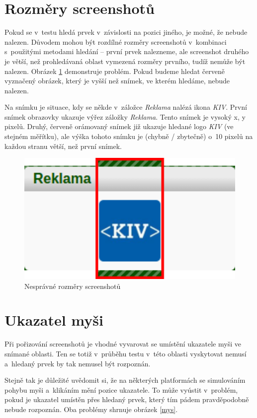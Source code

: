 	\section{Rozměry screenshotů}
	Pokud se v~testu hledá prvek v~závislosti na pozici jiného, je možné, že nebude nalezen. Důvodem mohou být rozdílné rozměry screenshotů v~kombinaci s~použitými metodami hledání -- první prvek nalezneme, ale screenshot druhého je větší, než prohledávaná oblast vymezená rozměry prvního, tudíž nemůže být nalezen. Obrázek \ref{rozmery} demonstruje problém. Pokud budeme hledat červeně vyznačený obrázek, který je vyšší než snímek, ve kterém hledáme, nebude nalezen.
	
	Na snímku je situace, kdy se někde v~záložce \emph{Reklama} nalézá ikona \emph{KIV}. První snímek obrazovky ukazuje výřez záložky \emph{Reklama}. Tento snímek je vysoký x, y pixelů. Druhý, červeně orámovaný snímek již ukazuje hledané logo \emph{KIV} (ve stejném měřítku), ale výška tohoto snímku je (chybně / zbytečně) o~10 pixelů na každou stranu větší, než první snímek.
	
	\begin{figure}[ht!]
		\centering
		\caption{Nesprávné rozměry screenshotů}
		\label{rozmery}
		\includegraphics[width=12.5cm]{img/Chyby/reklama.png}
	\end{figure}
	
	\section{Ukazatel myši}
	Při pořizování screenshotů je vhodné vyvarovat se umístění ukazatele myši ve snímané oblasti. Ten se totiž v~průběhu testu v~této oblasti vyskytovat nemusí a~hledaný prvek by tak nemusel být rozpoznán.
	
	Stejně tak je důležité uvědomit si, že na některých platformách se simulováním pohybu myši a~klikáním mění pozice ukazatele. To může vyústit v~problém, pokud je ukazatel umístěn přes hledaný prvek, který tím pádem pravděpodobně nebude rozpoznán. Oba problémy shrnuje obrázek \ref{mys}.
	
